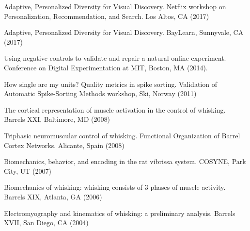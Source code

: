 \documentclass[line,11pt]{res}
\begin{document}
\begin{resume}
Adaptive, Personalized Diversity for Visual Discovery. Netflix workshop on Personalization, Recommendation, and Search. Los Altos, CA (2017)

Adaptive, Personalized Diversity for Visual Discovery. BayLearn, Sunnyvale, CA (2017)

Using negative controls to validate and repair a natural online experiment.  Conference on Digital Experimentation at MIT, Boston, MA (2014).

How single are my units? Quality metrics in spike sorting. Validation of Automatic Spike-Sorting Methods workshop, Ski, Norway (2011)

The cortical representation of muscle activation in the control of whisking. Barrels XXI, Baltimore, MD (2008)

Triphasic neuromuscular control of whisking. Functional Organization of Barrel Cortex Networks. Alicante, Spain (2008)

Biomechanics, behavior, and encoding in the rat vibrissa system. COSYNE, Park City, UT (2007)

Biomechanics of whisking: whisking consists of 3 phases of muscle activity. Barrels XIX, Atlanta, GA (2006)

Electromyography and kinematics of whisking: a preliminary analysis. Barrels XVII, San Diego, CA (2004)

\end{resume}
\end{document}
